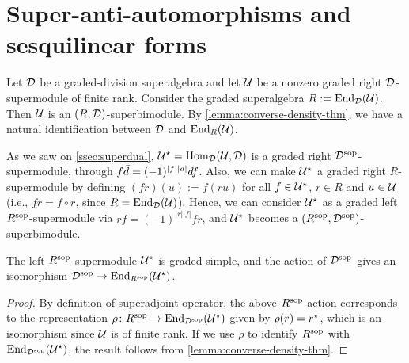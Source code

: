 \section[Super-anti-automorphisms and sesquilinear forms]{Super-anti-automorphisms and \texorpdfstring{\\}{} sesquilinear forms}\label{sec:super-anti-auto-and-sesquilinear}

Let $\mathcal{D}$ be a graded-division superalgebra and let $\mathcal U$ be a nonzero graded right $\mathcal{D}$-supermodule of finite rank. 
Consider the graded superalgebra $R := \operatorname{End}_{\mathcal{D}}(\mathcal U)$.
Then $\mathcal U$ is an $(R, \mathcal{D})$-superbimodule.
By \cref{lemma:converse-density-thm}, 
we have a natural identification between $\mathcal{D}$ and $\operatorname{End}_R(\mathcal U)$.


As we saw on \cref{ssec:superdual}, $\mathcal U^\star = \operatorname{Hom}_{\mathcal{D}} (\mathcal U, \mathcal{D})$ is a graded right $\mathcal{D}^{\mathrm{sop}}$-supermodule, through $f \bar d = (-1)^{|f||d|} df$.
Also, we can make $\mathcal U^\star$ a graded right $R$-supermodule by defining $(f r) (u) := f(r u)$ for all $f\in \mathcal U^\star$, $r\in R$ and $u\in \mathcal U$ (i.e., $f r = f \circ r$, since $R = \operatorname{End}_{\mathcal{D}}(\mathcal U)$).
Hence, we can consider $\mathcal U^\star$ as a graded left $R^{\mathrm{sop}}$-supermodule via $\bar r f = (-1)^{|r||f|} f r$, %
and $\mathcal U^\star$ becomes a $(R^{\mathrm{sop}}, \mathcal{D}^{\mathrm{sop}})$-superbimodule.

\begin{lemma}\label{lemma:U-star-R-sop}
	The left $R^{\mathrm{sop}}$-supermodule $\mathcal U^\star$ is graded-simple, and the action of $\mathcal{D}^{\mathrm{sop}}$ gives an isomorphism $\mathcal{D}^{\mathrm{sop}} \to \operatorname{End}_{R^{\mathrm{sop}}}(\mathcal U^\star)$.
\end{lemma}

\begin{proof}
	By definition of superadjoint operator, the above $R^{\mathrm{sop}}$-action corresponds to the representation $\rho\colon R^{\mathrm{sop}} \to \operatorname{End}_{\mathcal{D}^{\mathrm{sop}}} (\mathcal U^\star)$ given by $ \rho(r) = r^\star$, which is an isomorphism since $\mathcal U$ is of finite rank.
	If we use $\rho$ to identify $R^{\mathrm{sop}}$ with $\operatorname{End}_{\mathcal{D}^{\mathrm{sop}}} (\mathcal U^\star)$, the result follows from \cref{lemma:converse-density-thm}.
\end{proof}


